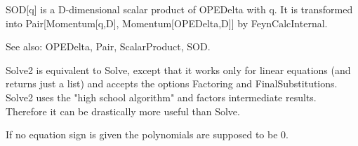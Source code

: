 


SOD[q] is a D-dimensional scalar product of OPEDelta with q. It is transformed into Pair[Momentum[q,D], Momentum[OPEDelta,D]] by
  FeynCalcInternal.

See also:  OPEDelta, Pair, ScalarProduct, SOD.





\dispSFoutmath{
\{ \}
}





Solve2 is equivalent to Solve, except that it works only for linear equations (and returns just a list) and accepts the options Factoring
  and FinalSubstitutions. Solve2 uses the "high school algorithm" and factors intermediate results. Therefore it can be drastically more
  useful than Solve.






If no equation sign is given the polynomials are supposed to be 0.



